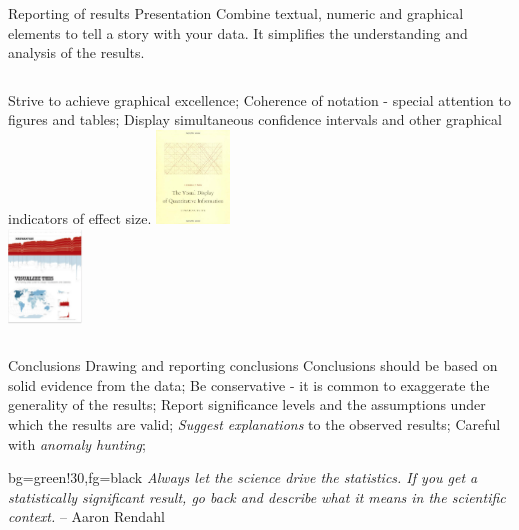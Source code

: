 \documentclass[t]{beamer}
\begin{document}

\begin{ftst}
{Reporting of results}
{Presentation}
Combine textual, numeric and graphical elements to tell a story with your data. It simplifies the understanding and analysis of the results.
\begin{columns}[T]
	\bitems Strive to achieve graphical excellence;
		\spitem Coherence of notation - special attention to figures and tables;
		\spitem Display simultaneous confidence intervals and other graphical indicators of effect size.
	\eitem
{}
	\centering\includegraphics[height=2.5cm]{../figs/tufte.jpg}\\
	\vone
	\centering\includegraphics[height=2.5cm]{../figs/yau.png}
\end{columns}
\end{ftst}

\begin{ftst}
{Conclusions}
{Drawing and reporting conclusions}
\bitems Conclusions should be based on solid evidence from the data;
	\spitem Be conservative - it is common to exaggerate the generality of the results;
	\spitem Report significance levels and the assumptions under which the results are valid;
	\spitem \textit{Suggest explanations} to the observed results;
	\spitem Careful with \textit{anomaly hunting};
\eitem

\begin{colorblock}{}{bg=green!30,fg=black}
	\small\textit{Always let the science drive the statistics. If you get a statistically significant result, go back and describe what it means in the scientific context.}
	\flushright\small -- Aaron Rendahl
\end{colorblock}
\end{ftst}
\end{document}
